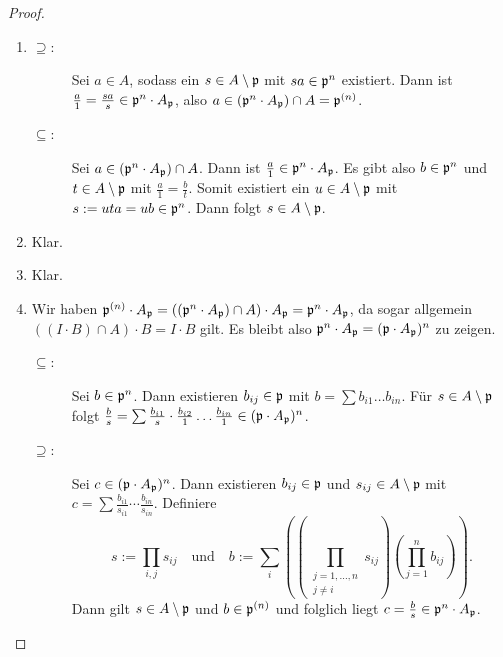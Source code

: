 \documentclass[12pt,a4paper]{scrartcl}
\theoremstyle{cplain}
\theoremstyle{cdef}
\begin{document}
\begin{proof}
	\leavevmode
	\begin{enumerate}[label=\ref{lem:9.9:\roman*}]
		\item \begin{description}
			\item[\glqq$\supseteq$\grqq:] Sei $a\in A$, sodass ein $s\in A\setminus \mathfrak{p}$ mit $sa\in \mathfrak{p}^n$ existiert. Dann ist $\frac a1 = \frac {sa}s\in \mathfrak{p}^n\cdot A_{\mathfrak{p}}$, also $a\in (\mathfrak{p}^n\cdot A_{\mathfrak{p}})\cap A = \mathfrak{p}^{(n)}$.
			\item[\glqq$\subseteq$\grqq:] Sei $a \in (\mathfrak{p}^n\cdot A_{\mathfrak{p}})\cap A$. Dann ist $\frac a1\in \mathfrak{p}^n\cdot A_{\mathfrak{p}}$. Es gibt also $b \in \mathfrak{p}^n$ und $t\in A\setminus \mathfrak{p}$ mit $\frac a1 = \frac bt$. Somit existiert ein $u\in A\setminus \mathfrak{p}$ mit $s := uta = ub \in \mathfrak{p}^n$. Dann folgt $s\in A\setminus \mathfrak{p}$.
		\end{description}
		\item Klar.
		\item Klar.
		\item Wir haben $\mathfrak{p}^{(n)}\cdot A_{\mathfrak{p}} = ((\mathfrak{p}^n\cdot A_{\mathfrak{p}})\cap A)\cdot A_{\mathfrak{p}} = \mathfrak{p}^n \cdot A_{\mathfrak{p}}$, da sogar allgemein $((I\cdot B)\cap A)\cdot B = I\cdot B$ gilt. Es bleibt also $\mathfrak{p}^n\cdot A_{\mathfrak{p}} = (\mathfrak{p}\cdot A_{\mathfrak{p}})^n$ zu zeigen.
		\begin{description}
			\item[\glqq$\subseteq$\grqq:] Sei $b\in \mathfrak{p}^n$. Dann existieren $b_{ij}\in \mathfrak{p}$ mit $b = \sum b_{i1}\dots b_{in}$. Für $s\in A\setminus \mathfrak{p}$ folgt $\frac bs = \sum \frac{b_{i1}}{s}\cdot \frac{b_{i2}}{1}\dots \frac{b_{in}}{1}\in (\mathfrak{p}\cdot A_{\mathfrak{p}})^n$.
			\item[\glqq$\supseteq$\grqq:] Sei $c \in (\mathfrak{p}\cdot A_{\mathfrak{p}})^n$. Dann existieren $b_{ij}\in\mathfrak{p}$ und $s_{ij}\in A\setminus \mathfrak{p}$ mit $c = \sum \frac{b_{i1}}{s_{i1}}\cdots \frac{b_{in}}{s_{in}}$. Definiere \[s := \prod_{i,j}s_{ij} \quad\text{und}\quad b := \sum_i\left(\left(\prod_{{\substack{j = 1,\dots, n\\j \neq i}}}s_{ij}\right)\left(\prod_{j = 1}^n b_{ij}\right)\right).\]
			Dann gilt $s\in A\setminus \mathfrak{p}$ und $b\in \mathfrak{p}^{(n)}$ und folglich liegt $c = \frac bs\in \mathfrak{p}^n\cdot A_{\mathfrak{p}}$.
			\qedhere
		\end{description}
	\end{enumerate}
\end{proof}

\end{document}
